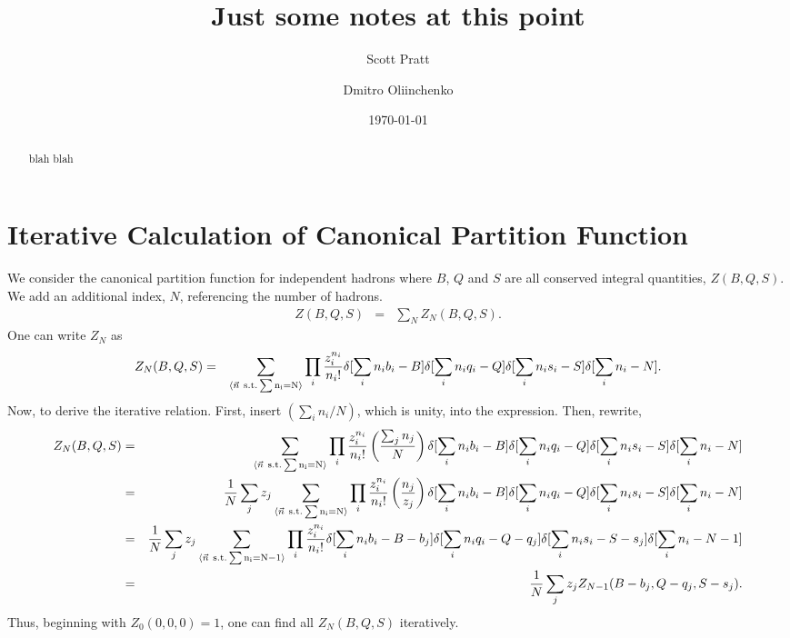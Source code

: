 \documentclass[letterpaper,aps,showpacs,floatfix,10pt,prc]{revtex4-1}
\begin{document}
\title{Just some notes at this point}
\author{Scott Pratt}
\author{Dmitro Oliinchenko}
\date{\today}

\pacs{}

\begin{abstract}
blah blah
\end{abstract}

\maketitle

\section{Iterative Calculation of Canonical Partition Function}

We consider the canonical partition function for independent hadrons where $B$, $Q$ and $S$ are all conserved integral quantities, $Z(B,Q,S)$. We add an additional index, $N$, referencing the number of hadrons.
\begin{eqnarray}
\label{eq:Zsum}
Z(B,Q,S)&=&\sum_N Z_N(B,Q,S).
\end{eqnarray}
One can write $Z_N$ as
\begin{eqnarray}
Z_N(B,Q,S)&=&\sum_{\langle \vec{n} \rm{~s.t.}\sum n_i=N\rangle}\prod_i\frac{z_i^{n_i}}{n_i!}\delta[\sum_in_ib_i-B]\delta[\sum_in_iq_i-Q]\delta[\sum_in_is_i-S]\delta[\sum_in_i-N].
\end{eqnarray}
Now, to derive the iterative relation. First, insert $(\sum_i n_i/N)$, which is unity, into the expression. Then, rewrite,
\begin{eqnarray}\label{eq:iterativeN}
\nonumber
Z_N(B,Q,S)&=&\sum_{\langle \vec{n} \rm{~s.t.}\sum n_i=N\rangle}\prod_i\frac{z_i^{n_i}}{n_i!}
\left(\frac{\sum_jn_j}{N}\right)
\delta[\sum_in_ib_i-B]\delta[\sum_in_iq_i-Q]\delta[\sum_in_is_i-S]\delta[\sum_in_i-N]\\
\nonumber
&=&\frac{1}{N}\sum_j z_j\sum_{\langle \vec{n} \rm{~s.t.}\sum n_i=N\rangle}\prod_i\frac{z_i^{n_i}}{n_i!}\left(\frac{n_j}{z_j}\right)
\delta[\sum_in_ib_i-B]\delta[\sum_in_iq_i-Q]\delta[\sum_in_is_i-S]\delta[\sum_in_i-N]\\
\nonumber
&=&\frac{1}{N}\sum_j z_j
\sum_{\langle \vec{n} \rm{~s.t.}\sum n_i=N-1\rangle}\prod_i\frac{z_i^{n_i}}{n_i!}
\delta[\sum_in_ib_i-B-b_j]\delta[\sum_in_iq_i-Q-q_j]\delta[\sum_in_is_i-S-s_j]
\delta[\sum_in_i-N-1]\\
&=&\frac{1}{N}\sum_jz_jZ_{N-1}(B-b_j,Q-q_j,S-s_j).
\end{eqnarray}
Thus, beginning with $Z_0(0,0,0)=1$, one can find all $Z_N(B,Q,S)$ iteratively.
\end{document}
